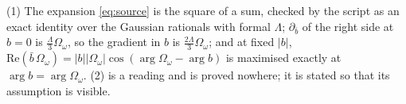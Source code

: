 (1) The expansion \eqref{eq:source} is the square of a sum, checked by the script as an exact identity over the Gaussian rationals with formal $\Lambda$; $\partial_{\bar b}$ of the right side at $b = 0$ is $\tfrac{\Lambda}{3}\Omega_{\omega}$, so the gradient in $b$ is $\tfrac{2\Lambda}{3}\Omega_{\omega}$; and at fixed $|b|$, $\mathrm{Re}(\bar b\,\Omega_{\omega}) = |b||\Omega_{\omega}|\cos(\arg\Omega_{\omega} - \arg b)$ is maximised exactly at $\arg b = \arg\Omega_{\omega}$. (2) is a reading and is proved nowhere; it is stated so that its assumption is visible.

